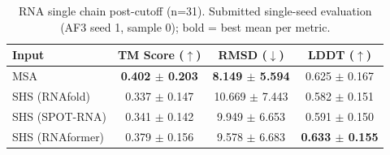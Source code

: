 \begin{table}[htbp]
\centering
\caption{RNA single chain post-cutoff (n=31). Submitted single-seed evaluation (AF3 seed 1, sample 0); bold = best mean per metric.}
\label{tab:rna_single_chain_post_cutoff}
\begin{tabular}{lccc}
\toprule
Input & TM Score ($\uparrow$) & RMSD ($\downarrow$) & LDDT ($\uparrow$) \\
\midrule
MSA & \textbf{0.402 $\pm$ 0.203} & \textbf{8.149 $\pm$ 5.594} & 0.625 $\pm$ 0.167 \\
SHS (RNAfold) & 0.337 $\pm$ 0.147 & 10.669 $\pm$ 7.443 & 0.582 $\pm$ 0.151 \\
SHS (SPOT-RNA) & 0.341 $\pm$ 0.142 & 9.949 $\pm$ 6.653 & 0.591 $\pm$ 0.150 \\
SHS (RNAformer) & 0.379 $\pm$ 0.156 & 9.578 $\pm$ 6.683 & \textbf{0.633 $\pm$ 0.155} \\
\bottomrule
\end{tabular}
\end{table}
